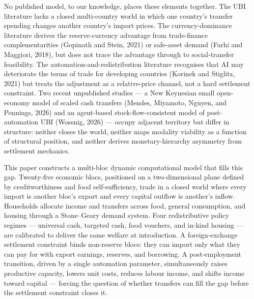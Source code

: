 \documentclass[preprint,review,12pt]{elsarticle}
\begin{document}
No published model, to our knowledge, places these elements together.
The UBI literature lacks a closed multi-country world in which one
country's transfer spending changes another country's import prices. The
currency-dominance literature derives the reserve-currency advantage
from trade-finance complementarities (Gopinath and Stein, 2021) or
safe-asset demand (Farhi and Maggiori, 2018), but does not trace the
advantage through to social-transfer feasibility. The
automation-and-redistribution literature recognises that AI may
deteriorate the terms of trade for developing countries (Korinek and
Stiglitz, 2021) but treats the adjustment as a relative-price channel,
not a hard settlement constraint. Two recent unpublished studies --- a
New Keynesian small open-economy model of scaled cash transfers (Mendes,
Miyamoto, Nguyen, and Pennings, 2026) and an agent-based
stock-flow-consistent model of post-automation UBI (Wossnig, 2026) ---
occupy adjacent territory but differ in structure: neither closes the
world, neither maps modality viability as a function of structural
position, and neither derives monetary-hierarchy asymmetry from
settlement mechanics.

This paper constructs a multi-bloc dynamic computational model that
fills this gap. Twenty-five economic blocs, positioned on a
two-dimensional plane defined by creditworthiness and food
self-sufficiency, trade in a closed world where every import is another
bloc's export and every capital outflow is another's inflow. Households
allocate income and transfers across food, general consumption, and
housing through a Stone--Geary demand system. Four redistributive policy
regimes --- universal cash, targeted cash, food vouchers, and in-kind
housing --- are calibrated to deliver the same welfare at introduction.
A foreign-exchange settlement constraint binds non-reserve blocs: they
can import only what they can pay for with export earnings, reserves,
and borrowing. A post-employment transition, driven by a single
automation parameter, simultaneously raises productive capacity, lowers
unit costs, reduces labour income, and shifts income toward capital ---
forcing the question of whether transfers can fill the gap before the
settlement constraint closes it.
\end{document}
